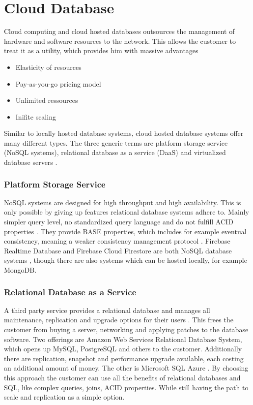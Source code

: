\section{Cloud Database}

Cloud computing and cloud hosted databases outsources the management of hardware and software resources to the network. This allows the customer to treat it as a utility, which provides him with massive advantages \cite{zhao2013framework}
\begin{itemize}
    \item Elasticity of resources
    \item Pay-as-you-go pricing model
    \item Unlimited ressources
    \item Inifite scaling
\end{itemize}

Similar to locally hosted database systems, cloud hosted database systems offer many different types. The three generic terms are platform storage service (NoSQL systems), relational database as a service (DaaS) and virtualized database servers \cite{zhao2013framework} \cite{mateljan2010cloud}.

\subsubsection{Platform Storage Service}
NoSQL systems are designed for high throughput and high availability. This is only possible by giving up features relational database systems adhere to. Mainly simpler query level, no standardized query language and do not fulfill ACID properties \cite{zhao2013framework}. They provide BASE properties, which includes for example eventual consistency, meaning a weaker consistency management protocol \cite{zhao2013framework}. Firebase Realtime Database and Firebase Cloud Firestore are both NoSQL database systems \cite{FirebaseDoc}, though there are also systems which can be hosted locally, for example MongoDB. 

\subsubsection{Relational Database as a Service}
A third party service provides a relational database and manages all maintenance, replication and upgrade options for their users \cite{zhao2013framework}. This frees the customer from buying a server, networking and applying patches to the database software. Two offerings are Amazon Web Services Relational Database System, which opens up MySQL, PostgreSQL and others to the customer. Additionally there are replication, snapshot and performance upgrade available, each costing an additional amount of money. The other is Microsoft SQL Azure \cite{mateljan2010cloud}. By choosing this approach the customer can use all the benefits of relational databases and SQL, like complex queries, joins, ACID properties. While still having the path to scale and replication as a simple option. 

